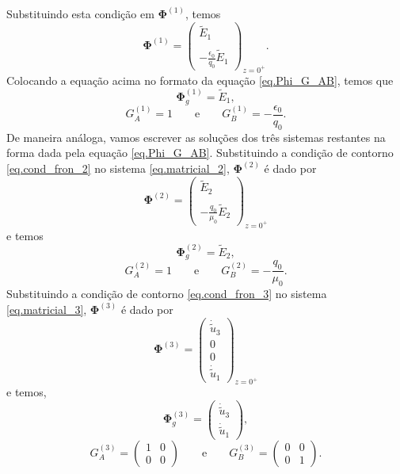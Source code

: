 Substituindo esta condi\c{c}\~ao em $\mathbf{\Phi}^{(1)}$, temos
\begin{equation*}
\mathbf{\Phi}^{(1)}=
\begin{pmatrix}
\tilde{E}_1\\\\
-\frac{\epsilon_0}{q_0}\tilde{E}_1
\end{pmatrix}_{z=0^+}.
\end{equation*}
Colocando a equa\c{c}\~ao acima no formato da equa\c{c}\~ao \ref{eq.Phi_G_AB}, temos que
\begin{equation*}
\mathbf{\Phi}_g^{(1)}=\tilde{E}_1,
\end{equation*}
\begin{equation*}
G_A^{(1)}=1\qquad\text{e}\qquad G_B^{(1)}=-\frac{\epsilon_0}{q_0}.
\end{equation*}
De maneira an\'aloga, vamos escrever as solu\c{c}\~oes dos tr\^es sistemas restantes na forma dada pela equa\c{c}\~ao \ref{eq.Phi_G_AB}. Substituindo a condi\c{c}\~ao de contorno \ref{eq.cond_fron_2} no sistema \ref{eq.matricial_2}, $\mathbf{\Phi}^{(2)}$ \'e dado por
\begin{equation*}
\mathbf{\Phi}^{(2)}=
\begin{pmatrix}
\tilde{E}_2\\\\
-\frac{q_0}{\mu_0}\tilde{E}_2
\end{pmatrix}_{z=0^+}
\end{equation*}
e temos
\begin{equation*}
\mathbf{\Phi}_g^{(2)}=\tilde{E}_2,
\end{equation*}
\begin{equation*}
G_A^{(2)}=1\qquad\text{e}\qquad G_B^{(2)}=-\frac{q_0}{\mu_0}.
\end{equation*}
Substituindo a condi\c{c}\~ao de contorno \ref{eq.cond_fron_3} no sistema \ref{eq.matricial_3}, $\mathbf{\Phi}^{(3)}$ \'e dado por
\begin{equation*}
\mathbf{\Phi}^{(3)}=
\begin{pmatrix}
\dot{\tilde{u}}_3\\
0\\
0\\
\dot{\tilde{u}}_1
\end{pmatrix}_{z=0^+}
\end{equation*}
e temos,
\begin{equation*}
\mathbf{\Phi}_g^{(3)}=
\begin{pmatrix}
\dot{\tilde{u}}_3\\
\dot{\tilde{u}}_1
\end{pmatrix},
\end{equation*}
\begin{equation*}
G_A^{(3)}=
\begin{pmatrix}
1&0\\
0&0
\end{pmatrix}
\qquad\text{e}\qquad G_B^{(3)}=
\begin{pmatrix}
0&0\\
0&1
\end{pmatrix}.
\end{equation*}

